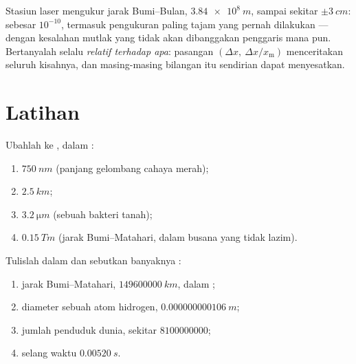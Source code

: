 \begin{remark}\label{rem:g10:orders-of-magnitude:precision}
Stasiun laser mengukur jarak Bumi--Bulan, $\qty{3.84e8}{m}$, sampai
sekitar $\pm\qty{3}{cm}$:  sebesar $10^{-10}$,
termasuk pengukuran paling tajam yang pernah dilakukan --- dengan
kesalahan mutlak yang tidak akan dibanggakan penggaris mana pun.
Bertanyalah selalu \emph{relatif terhadap apa}: pasangan
$(\Delta x,\ \Delta x / x_{\text{m}})$ menceritakan seluruh kisahnya,
dan masing-masing bilangan itu sendirian dapat menyesatkan.
\end{remark}

\section{Latihan}

\begin{exercise}[$\star$]\label{exo:g10:orders-of-magnitude:1}
Ubahlah ke , dalam :
\begin{enumerate}
  \item $\qty{750}{nm}$ (panjang gelombang cahaya merah);
  \item $\qty{2.5}{km}$;
  \item $\qty{3.2}{\micro m}$ (sebuah bakteri tanah);
  \item $\qty{0.15}{Tm}$ (jarak Bumi--Matahari, dalam busana yang tidak
        lazim).
\end{enumerate}
\end{exercise}

\begin{exercise}[$\star$]\label{exo:g10:orders-of-magnitude:2}
Tulislah dalam  dan sebutkan banyaknya :
\begin{enumerate}
  \item jarak Bumi--Matahari, $\qty{149600000}{km}$, dalam ;
  \item diameter sebuah atom hidrogen, $\qty{0.000000000106}{m}$;
  \item jumlah penduduk dunia, sekitar $\num{8100000000}$;
  \item selang waktu $\qty{0.00520}{s}$.
\end{enumerate}
\end{exercise}

